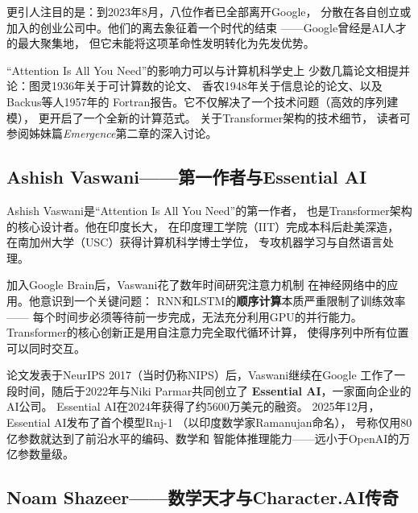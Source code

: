 更引人注目的是：到2023年8月，八位作者已全部离开Google，
分散在各自创立或加入的创业公司中。他们的离去象征着一个时代的结束
——Google曾经是AI人才的最大聚集地，
但它未能将这项革命性发明转化为先发优势。

\begin{corebox}
``Attention Is All You Need''的影响力可以与计算机科学史上
少数几篇论文相提并论：图灵1936年关于可计算数的论文、
香农1948年关于信息论的论文、以及Backus等人1957年的
Fortran报告。它不仅解决了一个技术问题（高效的序列建模），
更开启了一个全新的计算范式。
关于Transformer架构的技术细节，
读者可参阅姊妹篇\textit{Emergence}第二章的深入讨论。
\end{corebox}


\subsection{Ashish Vaswani——第一作者与Essential AI}
\label{sec:vaswani}

Ashish Vaswani是``Attention Is All You Need''的第一作者，
也是Transformer架构的核心设计者。他在印度长大，
在印度理工学院（IIT）完成本科后赴美深造，
在南加州大学（USC）获得计算机科学博士学位，
专攻机器学习与自然语言处理。

加入Google Brain后，Vaswani花了数年时间研究注意力机制
在神经网络中的应用。他意识到一个关键问题：
RNN和LSTM的\textbf{顺序计算}本质严重限制了训练效率——
每个时间步必须等待前一步完成，无法充分利用GPU的并行能力。
Transformer的核心创新正是用自注意力完全取代循环计算，
使得序列中所有位置可以同时交互。

论文发表于NeurIPS 2017（当时仍称NIPS）后，Vaswani继续在Google
工作了一段时间，随后于2022年与Niki Parmar共同创立了
\textbf{Essential AI}，一家面向企业的AI公司。
Essential AI在2024年获得了约5600万美元的融资。
2025年12月，Essential AI发布了首个模型Rnj-1
（以印度数学家Ramanujan命名），
号称仅用80亿参数就达到了前沿水平的编码、数学和
智能体推理能力——远小于OpenAI的万亿参数量级。

\bigskip

\subsection{Noam Shazeer——数学天才与Character.AI传奇}
\label{sec:shazeer}

